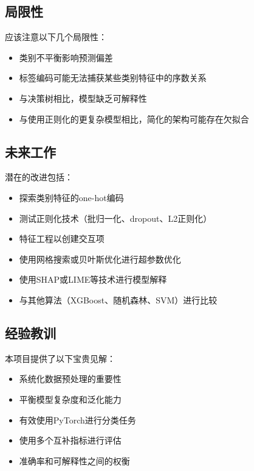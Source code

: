 \documentclass[conference]{IEEEtran}
\begin{document}
\subsection{局限性}
应该注意以下几个局限性：
\begin{itemize}
    \item 类别不平衡影响预测偏差
    \item 标签编码可能无法捕获某些类别特征中的序数关系
    \item 与决策树相比，模型缺乏可解释性
    \item 与使用正则化的更复杂模型相比，简化的架构可能存在欠拟合
\end{itemize}

\subsection{未来工作}
潜在的改进包括：
\begin{itemize}
    \item 探索类别特征的one-hot编码
    \item 测试正则化技术（批归一化、dropout、L2正则化）
    \item 特征工程以创建交互项
    \item 使用网格搜索或贝叶斯优化进行超参数优化
    \item 使用SHAP或LIME等技术进行模型解释
    \item 与其他算法（XGBoost、随机森林、SVM）进行比较
\end{itemize}

\subsection{经验教训}
本项目提供了以下宝贵见解：
\begin{itemize}
    \item 系统化数据预处理的重要性
    \item 平衡模型复杂度和泛化能力
    \item 有效使用PyTorch进行分类任务
    \item 使用多个互补指标进行评估
    \item 准确率和可解释性之间的权衡
\end{itemize}
\end{document}
